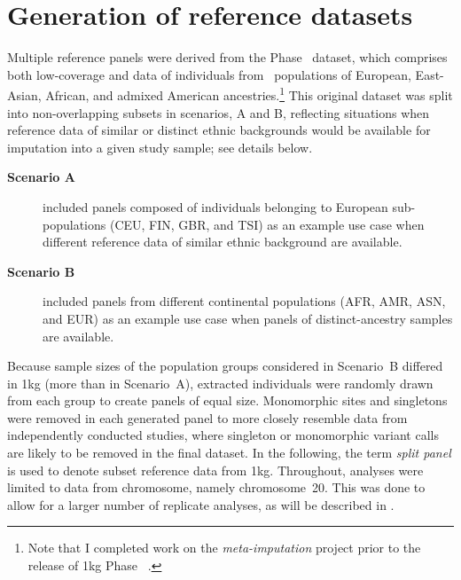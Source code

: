 %
\section{Generation of reference datasets}
\label{metaimpute_data}
%

Multiple reference panels were derived from the  Phase~ dataset, which comprises both low-coverage  and  data of  individuals from ~populations of European, East-Asian, African, and admixed American ancestries.\footnote{Note that I completed work on the \emph{meta-imputation} project prior to the release of \gls{1kg} Phase~ \citep{Auton:2015gk}.}
This original dataset was split into non-overlapping subsets in  scenarios, A and B, reflecting situations when reference data of similar or distinct ethnic backgrounds would be available for imputation into a given study sample; see details below.
\begin{description}
	\item[\textbf{Scenario A}] included  panels composed of individuals belonging to European sub-populations (CEU, FIN, GBR, and TSI) as an example use case when different reference data of similar ethnic background are available.
	\item[\textbf{Scenario B}] included  panels from different continental populations (AFR, AMR, ASN, and EUR) as an example use case when panels of distinct-ancestry samples are available.
\end{description}
Because sample sizes of the population groups considered in Scenario~B differed in \gls{1kg} (more than in Scenario~A), extracted individuals were randomly drawn from each group to create panels of equal size.
Monomorphic sites and singletons were removed in each generated panel to more closely resemble data from independently conducted studies, where singleton or monomorphic variant calls are likely to be removed in the final dataset.
In the following, the term \emph{split panel} is used to denote subset reference data from \gls{1kg}.
Throughout, analyses were limited to data from  chromosome, namely chromosome~20.
This was done to allow for a larger number of replicate analyses, as will be described in .


%

%

